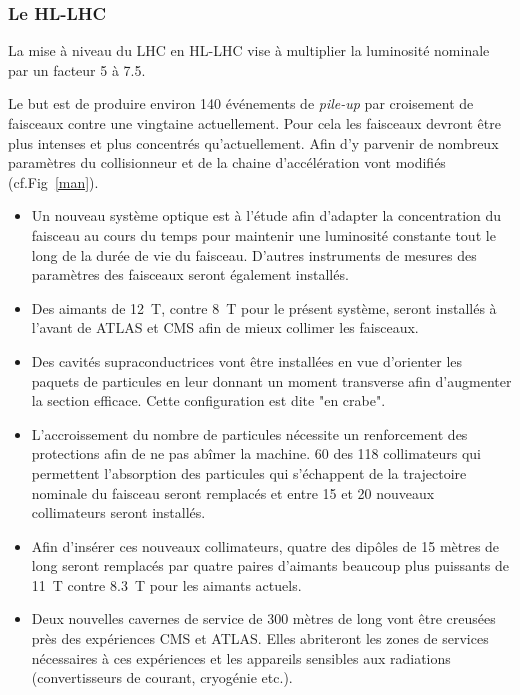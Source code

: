 \subsubsection{Le HL-LHC}
La mise à niveau du LHC en HL-LHC vise à multiplier la luminosité nominale par un facteur \num{5} à \num{7.5}.

Le but est de produire environ \num{140} événements de \textit{pile-up} par croisement de faisceaux contre une vingtaine actuellement. Pour cela les faisceaux devront être plus intenses et plus concentrés qu'actuellement. Afin d'y parvenir de nombreux paramètres du collisionneur et de la chaine d'accélération vont modifiés (cf.Fig~\ref{man}).

\begin{itemize}[label=$\bullet$]
	
 \item Un nouveau système optique est à l'étude afin d'adapter la concentration du faisceau au cours du temps pour maintenir une luminosité constante tout le long de la durée de vie du faisceau. D'autres instruments de mesures des paramètres des faisceaux seront également installés.
 
 \item Des aimants de \SI{12}{\tesla}, contre \SI{8}{\tesla} pour le présent système, seront installés à l'avant de ATLAS et CMS afin de mieux collimer les faisceaux.
 
 \item Des cavités supraconductrices vont être installées en vue d'orienter les paquets de particules en leur donnant un moment transverse afin d'augmenter la section efficace. Cette configuration est dite "en crabe".
 
 \item L'accroissement du nombre de particules nécessite un renforcement des protections afin de ne pas abîmer la machine. \num{60} des \num{118} collimateurs qui permettent l'absorption des particules qui s'échappent de la trajectoire nominale du faisceau seront remplacés et entre \num{15} et \num{20} nouveaux collimateurs seront installés.
 
 \item Afin d'insérer ces nouveaux collimateurs, quatre des dipôles de \num{15} mètres de long seront remplacés par quatre paires d'aimants beaucoup plus puissants de \SI{11}{\tesla} contre \SI{8.3}{\tesla} pour les aimants actuels.
 
 \item Deux nouvelles cavernes de service de \num{300} mètres de long vont être creusées près des expériences CMS et ATLAS. Elles abriteront les zones de services nécessaires à ces expériences et les appareils sensibles aux radiations (convertisseurs de courant, cryogénie etc.).
 

\end{itemize}
